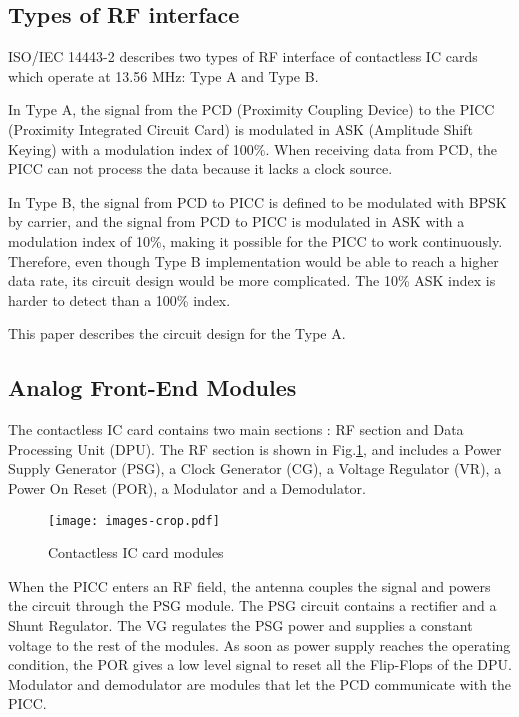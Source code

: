 \subsection{Types of RF interface}
ISO/IEC 14443-2 describes two types of RF interface of contactless IC cards which operate at 13.56 MHz: Type A and Type B. 

In Type A, the signal from the PCD (Proximity Coupling Device) to the PICC (Proximity Integrated Circuit Card) is modulated in ASK (Amplitude Shift Keying) with a modulation index of 100\%. When receiving data from PCD, the PICC can not process the data because it lacks a clock source. 

In Type B,  the signal from PCD to PICC is defined to be modulated with BPSK by carrier, and the signal from PCD to PICC is modulated in ASK with a modulation index of 10\%, making it possible for the PICC to work continuously. Therefore, even though Type B implementation would be able to reach a higher data rate, its circuit design would be more complicated. The 10\% ASK index is harder to detect than a 100\% index.

This paper describes the circuit design for the Type A. 


\subsection{Analog Front-End Modules}

The contactless IC card contains two main sections \cite{rfid_interface}: RF section and Data Processing Unit (DPU). The RF section is shown in Fig.\ref{fig:modules}, and includes a Power Supply Generator (PSG), a Clock Generator (CG), a Voltage Regulator (VR), a Power On Reset (POR), a Modulator  and a Demodulator. 

\begin{figure}[]
  \centering
  \texttt{[image: images-crop.pdf]}
  \caption{Contactless IC card modules}
  \label{fig:modules}
\end{figure}

When the PICC enters an RF field, the antenna couples the signal and powers the circuit through the PSG module. The PSG circuit contains a rectifier and a Shunt Regulator. The VG regulates the PSG power and supplies a constant voltage to the rest of the modules. As soon as power supply reaches the operating condition, the POR gives a low level signal to reset all the Flip-Flops of the DPU. Modulator and demodulator are modules that let the PCD communicate with the PICC.